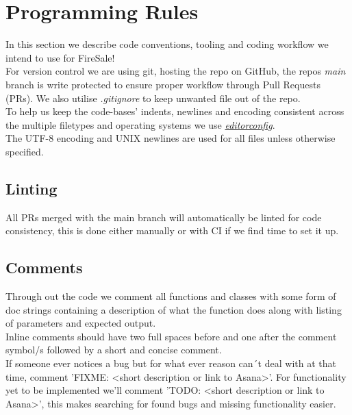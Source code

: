 \section{Programming Rules}

In this section we describe code conventions, tooling and coding workflow we intend to use for FireSale!\\

\noindent
For version control we are using git, hosting the repo on GitHub, the repos \textit{main} branch is write protected to ensure proper workflow through Pull Requests (PRs). We also utilise \textit{.gitignore} to keep unwanted file out of the repo.\\

\noindent
To help us keep the code-bases' indents, newlines and encoding consistent across the multiple filetypes and operating systems we use \href{https://editorconfig.org}{\textit{editorconfig}}.\\

\noindent The UTF-8 encoding and UNIX newlines are used for all files unless otherwise specified.

\subsection{Linting}
All PRs merged with the main branch will automatically be linted for code consistency, this is done either manually or with CI if we find time to set it up.

\subsection{Comments}
Through out the code we comment all functions and classes with some form of doc strings containing a description of what the function does along with listing of parameters and expected output.\\

\noindent
Inline comments should have two full spaces before and one after the comment symbol/s followed by a short and concise comment.\\

\noindent
If someone ever notices a bug but for what ever reason can´t deal with at that time, comment 'FIXME: <short description or link to Asana>'. For functionality yet to be implemented we'll comment 'TODO: <short description or link to Asana>', this makes searching for found bugs and missing functionality easier.\\

